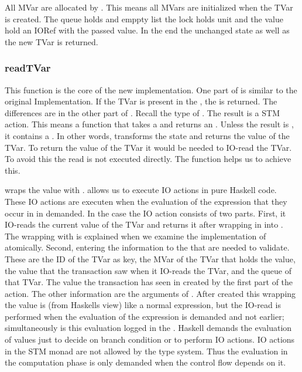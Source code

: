 All MVar are allocated by . This means all MVars are initialized when the TVar is created.
The queue holds and emppty list the lock holds unit and the value hold an IORef with the passed value.
In the end the unchanged state as well as the new TVar is returned.

\subsubsection{readTVar}
This function is the core of the new implementation. One part of  is similar to the original 
Implementation. If the TVar is present in the , the  is returned.
The differences are in the other part of . Recall the type of .
The result is a STM action. This means a function that takes a  and returns an . 
Unless the result is , it contains a . In other words,  transforms
the state and returns the value of the TVar. To return the value of the TVar it would be needed to IO-read the
TVar. To avoid this the read is not executed directly. The function  helps us to achieve this.

 wraps
the value with .  allows us to execute IO actions in pure
Haskell code. These IO actions are executen when the evaluation of the expression that they occur in 
in demanded. In the case the IO action consists of two parts. First, it IO-reads the 
current value of the TVar and returns it after wrapping in into . The wrapping with 
 is explained when we examine the implementation of atomically. Second, entering the 
information to the  that are needed to validate. These are the ID of the TVar as 
key, the MVar of the TVar that holds the value, the value that the transaction saw when it IO-reads
the TVar, and the queue of that TVar. The value the transaction has seen in created by the first 
part of the  action. The other information are the arguments of . After 
created this wrapping the value is (from Haskells view) like a normal expression, but the IO-read is
performed when the evaluation of the expression is demanded and not earlier; simultaneously is this 
evaluation logged in the . Haskell demands the evaluation of values just to decide on
branch condition or to perform IO actions. IO actions in the STM monad are not allowed by the type
system. Thus the evaluation in the computation phase is only demanded when the control flow depends 
on it. 

